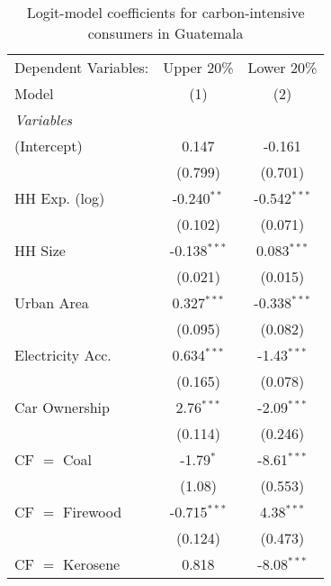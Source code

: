 
\begin{table}[htbp!]
   \centering
   \small
   \begin{adjustbox}{width = 1\textwidth, max height = 0.95\textheight, center}
      \begin{threeparttable}[b]
         \caption{\label{tab:Logit_1_GTM} Logit-model coefficients for carbon-intensive consumers in Guatemala}
         \begin{tabular}{lcc}
            \tabularnewline \midrule \midrule
            Dependent Variables: & Upper 20\%     & Lower 20\%\\   
            Model                & (1)            & (2)\\  
            \midrule
            \emph{Variables}\\
            (Intercept)          & 0.147          & -0.161\\   
                                 & (0.799)        & (0.701)\\   
            HH Exp. (log)        & -0.240$^{**}$  & -0.542$^{***}$\\   
                                 & (0.102)        & (0.071)\\   
            HH Size              & -0.138$^{***}$ & 0.083$^{***}$\\   
                                 & (0.021)        & (0.015)\\   
            Urban Area           & 0.327$^{***}$  & -0.338$^{***}$\\   
                                 & (0.095)        & (0.082)\\   
            Electricity Acc.     & 0.634$^{***}$  & -1.43$^{***}$\\   
                                 & (0.165)        & (0.078)\\   
            Car Ownership        & 2.76$^{***}$   & -2.09$^{***}$\\   
                                 & (0.114)        & (0.246)\\   
            CF $=$ Coal          & -1.79$^{*}$    & -8.61$^{***}$\\   
                                 & (1.08)         & (0.553)\\   
            CF $=$ Firewood      & -0.715$^{***}$ & 4.38$^{***}$\\   
                                 & (0.124)        & (0.473)\\   
            CF $=$ Kerosene      & 0.818          & -8.08$^{***}$\\   

\end{tabular}
\end{threeparttable}
\end{adjustbox}
\end{table}
